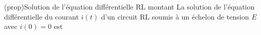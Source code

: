 \documentclass[../../main/main.tex]{subfiles}
\begin{document}
\begin{tcb}[label=prop:isolu, sidebyside, righthand ratio=.4](prop){Solution
			de l'équation différentielle RL montant}
	La solution de l'équation différentielle du courant $i(t)$ d'un circuit RL
	soumis à un échelon de tension $E$ avec $i(0) = 0$ est
	\psw{
		\[
			\boxed{i(t) = \frac{E}{R}\left(1-\exp\left(-\frac{t}{\tau}\right)\right)}
		\]
	}
	\vspace{-15pt}
	\tcblower
	\begin{center}
	\end{center}
\end{tcb}
\end{document}
